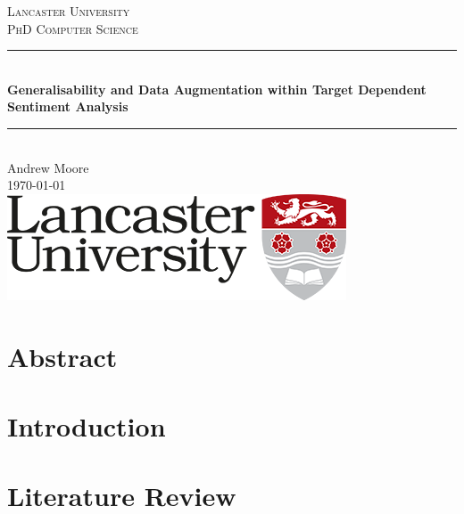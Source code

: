 \documentclass[11pt]{report}
\begin{document}
\begin{titlepage}

\newcommand{\HRule}{\rule{\linewidth}{0.5mm}} %

\center %

\textsc{\LARGE Lancaster University}\\[1.5cm] 
\textsc{\Large PhD Computer Science}\\[0.5cm]

\HRule \\[0.4cm]
{ \huge \bfseries Generalisability and Data Augmentation within Target Dependent Sentiment Analysis}\\[0.4cm] %
\HRule \\[1.5cm]
 
\large Andrew Moore
\hfill \\[0.7cm]
{\large \today}\\[2cm]

\includegraphics{main/uni_logo.png}\\[1cm] 

\vfill %

\end{titlepage}

\chapter*{Abstract}


\tableofcontents

\chapter{Introduction}
\chapter{Literature Review}
\label{chapter:lit_review}

\end{document}
